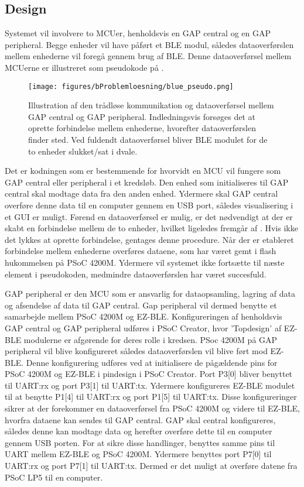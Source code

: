 \subsection{Design}
Systemet vil involvere to MCUer, henholdsvis en GAP central og en GAP peripheral. Begge enheder vil have påført et BLE modul, således dataoverførslen mellem enhederne vil foregå gennem brug af BLE. Denne dataoverførsel mellem MCUerne er illustreret som pseudokode på . 

\begin{figure}[H]
	\centering
	\texttt{[image: figures/bProblemloesning/blue\_pseudo.png]}
	\caption{Illustration af den trådløse kommunikation og dataoverførsel mellem GAP central og GAP peripheral. Indledningsvis forsøges det at oprette forbindelse mellem enhederne, hvorefter dataoverførslen finder sted. Ved fuldendt dataoverførsel bliver BLE modulet for de to enheder slukket/sat i dvale.}
	\label{fig:blue_pseudo}
\end{figure}

Det er kodningen som er bestemmende for hvorvidt en MCU vil fungere som GAP central eller peripheral i et kredsløb. Den enhed som initialiseres til GAP central skal modtage data fra den anden enhed. Ydermere skal GAP central overføre denne data til en computer gennem en USB port, således visualisering i et GUI er muligt. \newline
Førend en dataoverførsel er mulig, er det nødvendigt at der er skabt en forbindelse mellem de to enheder, hvilket ligeledes fremgår af . Hvis ikke det lykkes at oprette forbindelse, gentages denne procedure. Når der er etableret forbindelse mellem enhederne overføres dataene, som har været gemt i flash hukommelsen på PSoC 4200M. Ydermere vil systemet ikke fortsætte til næste element i pseudokoden, medmindre dataoverførslen har været succesfuld.  

GAP peripheral er den MCU som er ansvarlig for dataopsamling, lagring af data og afsendelse af data til GAP central. Gap peripheral vil dermed benytte et samarbejde mellem PSoC 4200M og EZ-BLE. Konfigureringen af henholdsvis GAP central og GAP peripheral udføres i PSoC Creator, hvor ’Topdesign’ af EZ-BLE modulerne er afgørende for deres rolle i kredsen. \newline
PSoc 4200M på GAP peripheral vil blive konfigureret således dataoverførslen vil blive ført mod EZ-BLE. Denne konfigurering udføres ved at initialisere de pågældende pins for PSoC 4200M og EZ-BLE i pindesign i PSoC Creator. Port P3[0] bliver benyttet til UART:rx og port P3[1] til UART:tx. Ydermere konfigureres EZ-BLE modulet til at benytte P1[4] til UART:rx og port P1[5] til UART:tx. Disse konfigureringer sikrer at der forekommer en dataoverførsel fra PSoC 4200M og videre til EZ-BLE, hvorfra dataene kan sendes til GAP central. \citep{Semiconductor20164200M} \newline
GAP skal central konfigureres, således denne kan modtage data og herefter overføre dette til en computer gennem USB porten. For at sikre disse handlinger, benyttes samme pins til UART mellem EZ-BLE og PSoC 4200M. Ydermere benyttes port P7[0] til UART:rx og port P7[1] til UART:tx. Dermed er det muligt at overføre datene fra PSoC LP5 til en computer. 

